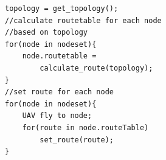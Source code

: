 \begin{lstlisting}[language={[ANSI]C},label=update,caption={An example of deploy routing algorithm},keywordstyle=\color{blue!70},showstringspaces=false, commentstyle=\color{red!50!green!80!blue!70},frame=single,captionpos=t, rulesepcolor=\color{red!20!green!20!blue!20}]
topology = get_topology();
//calculate routetable for each node 
//based on topology 
for(node in nodeset){
	node.routetable = 
		calculate_route(topology);
}
//set route for each node
for(node in nodeset){
	UAV fly to node;
	for(route in node.routeTable) 
  		set_route(route);
}

\end{lstlisting}


